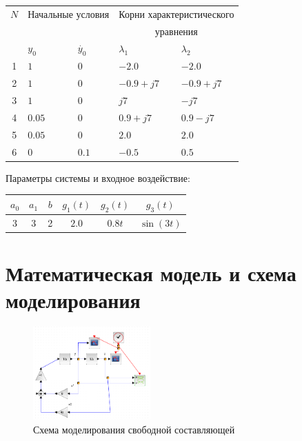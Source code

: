 \documentclass[12pt, a4paper] {ncc}
\begin{document}
\begin{center}
\begin{tabularx}{0.8\textwidth}{|c|X|X|X|X|}
\hline
$N$ & \multicolumn{2}{c|}{Начальные условия} & \multicolumn{2}{c|}{Корни характеристического} \\
    & \multicolumn{2}{c|}{}                  & \multicolumn{2}{c|}{уравнения} \\
\cline{2-5}
    & $y_0$  & $\dot{y_0}$ & $\lambda_1$  & $\lambda_2$  \\
\hline
1   & $1$    & $0$         & $-2.0$       & $-2.0$       \\
2   & $1$    & $0$         & $-0.9 + j7$  & $-0.9 + j7 $ \\
3   & $1$    & $0$         & $j7 $        & $-j7 $       \\
4   & $0.05$ & $0$         & $0.9 + j7 $  & $0.9 - j7 $  \\
5   & $0.05$ & $0$         & $2.0$        & $2.0$        \\
6   & $0$    & $0.1$       & $-0.5$       & $0.5$        \\
\hline
\end{tabularx}
\end{center}

Параметры системы и входное воздействие:

\begin{center}
\begin{tabular}{|c|c|c|c|c|c|}
\hline
$a_0$ & $a_1$ & $b$ & $g_1(t)$ & $g_2(t)$ & $g_3(t)$ \\
\hline
3 & 3 & 2 & $2.0$ & $0.8t$ & $\sin(3t)$ \\
\hline
\end{tabular}
\end{center}

\section{Математическая модель и схема моделирования}

\begin{figure}[ht!]
\begin{center}
\includegraphics[width=0.4\textwidth]{scheme}
\end{center}
\caption*{Схема моделирования свободной составляющей}
\end{figure}
\end{document}

